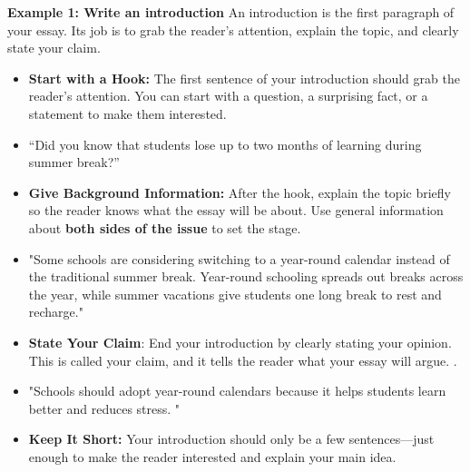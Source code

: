 \documentclass[12pt]{article}
\begin{document}
\vspace{1em}

\begin{tcolorbox}[colframe=black!60, colback=white, 
coltitle=black, colbacktitle=black!15, fonttitle=\bfseries\Large, 
title=Examples, halign title=center, left=10pt, right=10pt, top=10pt, bottom=15pt]

\textbf{Example 1: Write an introduction}
An introduction is the first paragraph of your essay. Its job is to grab the reader's attention, explain the topic, and clearly state your claim.   
    \begin{itemize}
        \item \textbf{Start with a Hook: }The first sentence of your introduction should grab the reader’s attention. You can start with a question, a surprising fact, or a statement to make them interested. 
         \end{itemize}
        \begin{itemize}
            \item “Did you know that students lose up to two months of learning during summer break?”  
        \end{itemize}
         \begin{itemize}
        \item \textbf{Give Background Information: } After the hook, explain the topic briefly so the reader knows what the essay will be about. Use general information about \textbf{both sides of the issue} to set the stage.
          \end{itemize}
        \begin{itemize}
            \item "Some schools are considering switching to a year-round calendar instead of the traditional summer break. Year-round schooling spreads out breaks across the year, while summer vacations give students one long break to rest and recharge."
        \end{itemize}
          \begin{itemize}
        \item \textbf{State Your Claim}: End your introduction by clearly stating your opinion. This is called your claim, and it tells the reader what your essay will argue.  . 
        \end{itemize}
        \begin{itemize}
            \item "Schools should adopt year-round calendars because it helps students learn better and reduces stress. "
        \end{itemize}
        \begin{itemize}
        \item \textbf{Keep It Short:} Your introduction should only be a few sentences—just enough to make the reader interested and explain your main idea. 
        \end{itemize}


\end{tcolorbox}
\end{document}
